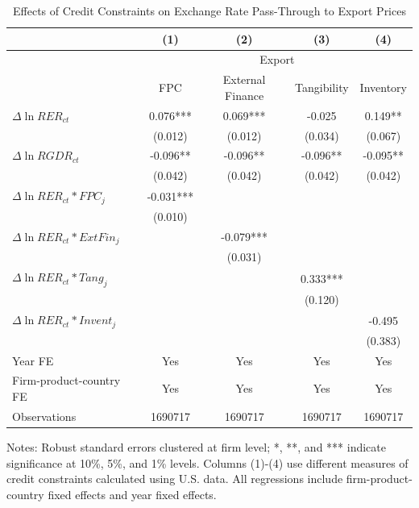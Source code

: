\documentclass[12pt]{article}
\begin{document}
\begin{table}[htbp]
	\centering
	\caption{Effects of Credit Constraints on Exchange Rate Pass-Through to Export Prices}
	\begin{threeparttable}	
		\begin{tabular}{lcccc}
			\toprule
			& (1)   & (2)   & (3)   & (4) \\
			\midrule
			 & \multicolumn{4}{c}{Export} \\
			& FPC   & External Finance & Tangibility & Inventory \\
			\midrule
			$\Delta \ln RER_{ct}$ & 0.076*** & 0.069*** & -0.025 & 0.149** \\
			& (0.012) & (0.012) & (0.034) & (0.067) \\
			$\Delta \ln RGDR_{ct}$ & -0.096** & -0.096** & -0.096** & -0.095** \\
			& (0.042) & (0.042) & (0.042) & (0.042) \\
			$\Delta \ln RER_{ct}*FPC_{j}$ & -0.031*** &       &       &  \\
			& (0.010) &       &       &  \\
			$\Delta \ln RER_{ct}*ExtFin_{j}$ &       & -0.079*** &       &  \\
			&       & (0.031) &       &  \\
			$\Delta \ln RER_{ct}*Tang_{j}$ &       &       & 0.333*** &  \\
			&       &       & (0.120) &  \\
			$\Delta \ln RER_{ct}*Invent_{j}$ &       &       &       & -0.495 \\
			&       &       &       & (0.383) \\
			Year FE  & Yes   & Yes   & Yes   & Yes \\
			Firm-product-country FE & Yes   & Yes   & Yes   & Yes \\
			Observations & 1690717 & 1690717 & 1690717 & 1690717 \\
			\bottomrule
		\end{tabular}
		\begin{tablenotes}
			\footnotesize
			\item[Notes:] Robust standard errors clustered at firm level; *, **, and *** indicate significance at 10\%, 5\%, and 1\% levels. Columns (1)-(4) use different measures of credit constraints calculated using U.S. data. All regressions include firm-product-country fixed effects and year fixed effects.
		\end{tablenotes}
	\end{threeparttable}
	\label{tab.credit.exp}
\end{table}
\end{document}
